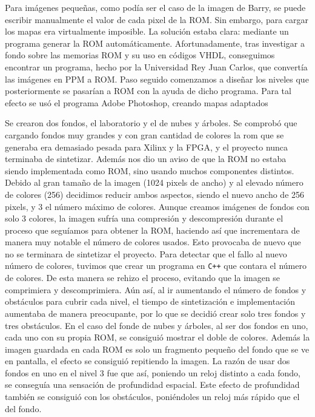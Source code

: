 \documentclass[11pt, a4paper, spanish, openright, twoside]{book}
\begin{document}
Para imágenes pequeñas, como podía ser el caso de la imagen de Barry, se puede escribir manualmente el valor de cada pixel de la ROM. Sin embargo, para cargar los mapas era virtualmente imposible. La solución estaba clara: mediante un programa generar la ROM automáticamente. Afortunadamente, tras investigar a fondo sobre las memorias ROM y su uso en códigos VHDL, conseguimos encontrar un programa, hecho por la Universidad Rey Juan Carlos, que convertía las imágenes en PPM a ROM. Paso seguido comenzamos a diseñar los niveles que posteriormente se pasarían a ROM con la ayuda de dicho programa. Para tal efecto se usó el programa Adobe Photoshop, creando mapas adaptados 

Se crearon dos fondos, el laboratorio y el de nubes y árboles. Se comprobó que cargando fondos muy grandes y con gran cantidad de colores la rom que se generaba era demasiado pesada para Xilinx y la FPGA, y el proyecto nunca terminaba de sintetizar. Además nos dio un aviso de que la ROM no estaba siendo implementada como ROM, sino usando muchos componentes distintos. Debido al gran tamaño de la imagen (1024 pixels de ancho) y al elevado número de colores (256) decidimos reducir ambos aspectos, siendo el nuevo ancho de 256 pixels, y 3 el número máximo de colores. Aunque creamos imágenes de fondos con solo 3 colores, la imagen sufría una compresión y descompresión durante el proceso que seguíamos para obtener la ROM, haciendo así que incrementara de manera muy notable el número de colores usados. Esto provocaba de nuevo que no se terminara de sintetizar el proyecto. Para detectar que el fallo al nuevo número de colores, tuvimos que crear un programa en \texttt{C++} que contara el número de colores. De esta manera se rehizo el proceso, evitando que la imagen se comprimiera y descomprimiera. Aún así, al ir aumentando el número de fondos y obstáculos para cubrir cada nivel, el tiempo de sintetización e implementación aumentaba de manera preocupante, por lo que se decidió crear solo tres fondos y tres obstáculos. En el caso del fonde de nubes y árboles, al ser dos fondos en uno, cada uno con su propia ROM, se consiguió mostrar el doble de colores. Además la imagen guardada en cada ROM es solo un fragmento pequeño del fondo que se ve en pantalla, el efecto se consiguió repitiendo la imagen.
La razón de usar dos fondos en uno en el nivel 3 fue que así, poniendo un reloj distinto a cada fondo, se conseguía una sensación de profundidad espacial. Este efecto de profundidad también se consiguió con los obstáculos, poniéndoles un reloj más rápido que el del fondo. 
\end{document}
